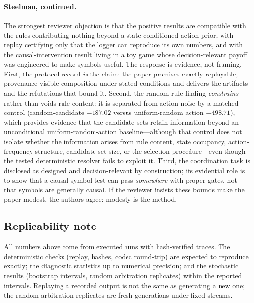 \documentclass[11pt]{article}
\begin{document}
\paragraph{Steelman, continued.}
The strongest reviewer objection is that the positive results are compatible with the rules contributing
nothing beyond a state-conditioned action prior, with replay certifying only that the logger can
reproduce its own numbers, and with the causal-intervention result living in a toy game whose
decision-relevant payoff was engineered to make symbols useful. The response is evidence, not framing.
First, the protocol record \emph{is} the claim: the paper promises exactly replayable,
provenance-visible composition under stated conditions and delivers the artifacts and the refutations
that bound it. Second, the random-rule finding \emph{constrains} rather than voids rule content: it is
separated from action noise by a matched control (random-candidate $-187.02$ versus uniform-random
action $-498.71$), which provides evidence that the candidate sets retain information beyond an
unconditional uniform-random-action baseline---although that control does not isolate whether the
information arises from rule content, state occupancy, action-frequency structure, candidate-set size,
or the selection procedure---even though the tested
deterministic resolver fails to exploit it. Third, the coordination task is disclosed as designed and
decision-relevant by construction; its evidential role is to show that a causal-symbol test can pass
\emph{somewhere} with proper gates, not that symbols are generally causal. If the reviewer insists these
bounds make the paper modest, the authors agree: modesty is the method.

\subsection{Replicability note}
\label{sec:discussion:replication}

All numbers above come from executed runs with hash-verified traces. The deterministic checks
(replay, hashes, codec round-trip) are expected to reproduce exactly; the diagnostic statistics
up to numerical precision; and the stochastic results (bootstrap intervals, random arbitration
replicates) within the reported intervals. Replaying a recorded output is not the same
as generating a new one; the random-arbitration replicates are fresh generations under fixed
streams.
\end{document}

